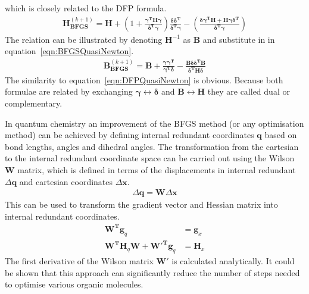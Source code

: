 which is closely related to the \ac{DFP} formula.
%
\begin{align}
    \mathbf{H}_\mathbf{BFGS}^{(k+1)}=\mathbf{H}
    +\left(1+\frac{\bm{\gamma}^\mathbf{T}\mathbf{H}\bm{\gamma}}{\bm{\delta}^\mathbf{T}\bm{\gamma}}\right)
    \frac{\bm{\delta\delta}^\mathbf{T}}{\bm{\delta}^\mathbf{T}\bm{\gamma}}
    -\left(\frac{\bm{\delta\gamma}^\mathbf{T}\mathbf{H}+\mathbf{H}\bm{\gamma\delta}^\mathbf{T}}{\bm{\delta}^\mathbf{T}\bm{\gamma}}\right)\label{eqn:BFGSQuasiNewton}
\end{align}
%
The relation can be illustrated by denoting $\mathbf{H}^{-1}$ as $\mathbf{B}$
and substitute in in equation~\eqref{eqn:BFGSQuasiNewton}.
%
\begin{align}
    \mathbf{B}_\mathbf{BFGS}^{(k+1)}=\mathbf{B}+\frac{\bm{\gamma\gamma}^\mathbf{T}}{\bm{\gamma}^\mathbf{T}\bm{\delta}}
    -\frac{\mathbf{B}\bm{\delta\delta}^\mathbf{T}\mathbf{B}}{\bm{\delta}^\mathbf{T}\mathbf{H}\bm{\delta}}
\end{align}
%
The similarity to equation~\eqref{eqn:DFPQuasiNewton} is obvious. Because both
formulae are related by exchanging $\bm{\gamma}\leftrightarrow\bm{\delta}$ and
$\mathbf{B}\leftrightarrow\mathbf{H}$ they are called dual or complementary.

In quantum chemistry an improvement of the \ac{BFGS} method (or any
optimisation method) can be achieved by defining internal redundant coordinates
$\mathbf{q}$ based on bond lengths, angles and dihedral
angles.\autocite{Pulay_Systematicinitiogradient_1979,Pulay_Geometryoptimizationredundant_1992,Fogarasi_calculationinitiomolecular_1992}
The transformation from the cartesian to the internal redundant coordinate
space can be carried out using the Wilson $\mathbf{W}$ matrix, which is defined
in terms of the displacements in internal redundant $\Delta \mathbf{q}$ and
cartesian coordinates $\Delta\mathbf{x}$.
%
\begin{align}
    \Delta \mathbf{q} = \mathbf{W} \Delta \mathbf{x}
\end{align}
%
This can be used to transform the gradient vector and Hessian matrix into
internal redundant coordinates.
%
\begin{align}
    \mathbf{W^T}\mathbf{g}_q &= \mathbf{g}_x\\
    \mathbf{W^T}\mathbf{H}_q\mathbf{W} + \mathbf{W'^{T}}\mathbf{g}_q &= \mathbf{H}_x 
\end{align}
%
The first derivative of the Wilson matrix $\mathbf{W}'$ is calculated
analytically. It could be shown that this approach can significantly reduce the
number of steps needed to optimise various organic molecules.\autocite{Peng_Usingredundantinternal_1996}

